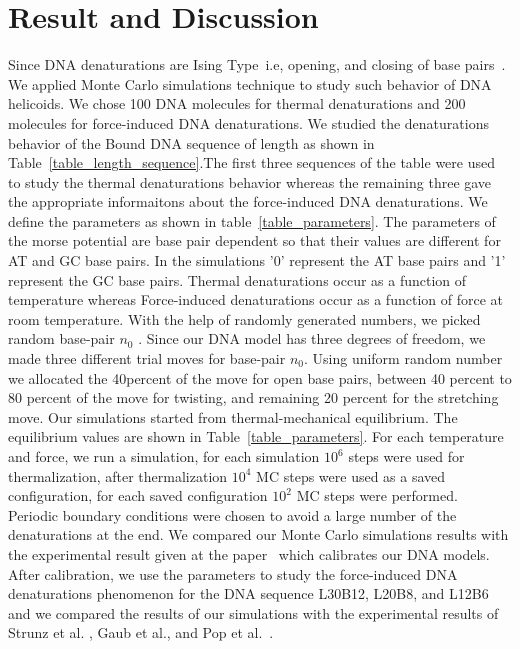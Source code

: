 \documentclass[12pt,masters,final]{UTRGVthesis}
\begin{document}
\chapter{Result and Discussion}
Since DNA denaturations are Ising Type \,i.e, opening, and closing of base pairs~\cite{poland1966d}. We applied Monte Carlo simulations technique to study such behavior of DNA helicoids. We chose 100 DNA molecules for thermal denaturations and 200 molecules for force-induced DNA denaturations. We studied the denaturations behavior of the  Bound DNA sequence of length as shown in Table~\ref{table_length_sequence}.The first three sequences of the table were used to study the thermal denaturations behavior whereas the remaining three gave the appropriate informaitons about the force-induced DNA denaturations. We define the parameters as shown in table \,\ref{table_parameters}. The parameters of the morse potential are base pair dependent so that their values are different for AT and GC base pairs. In the simulations '0' represent the AT base pairs and '1' represent the GC base pairs. Thermal denaturations occur as a function of temperature whereas Force-induced denaturations occur as a function of force at room temperature. With the help of randomly generated numbers, we picked random base-pair $n_{0}$ . Since our DNA model has three degrees of freedom, we made three different trial moves for base-pair $n_0$. Using uniform random number we allocated the 40percent of the move for open base pairs, between 40 percent to 80 percent of the move for twisting, and remaining 20 percent for the stretching move. Our simulations started from thermal-mechanical equilibrium. The equilibrium values are shown in Table~\ref{table_parameters}. For each temperature and force, we run a simulation, for each simulation $10^6$ steps were used for thermalization, after thermalization $10^4$ MC steps were used as a saved configuration, for each saved configuration $10^2$ MC steps were performed. Periodic boundary conditions were chosen to avoid a large number of the denaturations at the end. We compared our Monte Carlo simulations results with the experimental result given at the paper~\cite{zeng2003length,zeng2004bubble} which calibrates our DNA models. After calibration, we use the parameters to study the force-induced DNA denaturations phenomenon for the DNA sequence L30B12, L20B8, and L12B6 and we compared the results of our simulations with the experimental results of Strunz et al. , Gaub et al., and Pop et al.~\cite{Strunz:1999, Pope:2001, Morfill:2007}.\\ 
\end{document}
